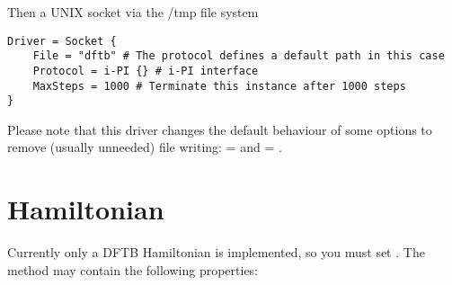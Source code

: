 Then a UNIX socket via the /tmp file system
\begin{verbatim}
Driver = Socket {
    File = "dftb" # The protocol defines a default path in this case
    Protocol = i-PI {} # i-PI interface
    MaxSteps = 1000 # Terminate this instance after 1000 steps
}
\end{verbatim}

Please note that this driver changes the default behaviour of some options to
remove (usually unneeded) file writing:  =  and
 = .


\section{Hamiltonian}
\label{sec:dftbp.Hamiltonian}

Currently only a DFTB Hamiltonian is implemented, so you must set
. The  method may contain the
following properties:


